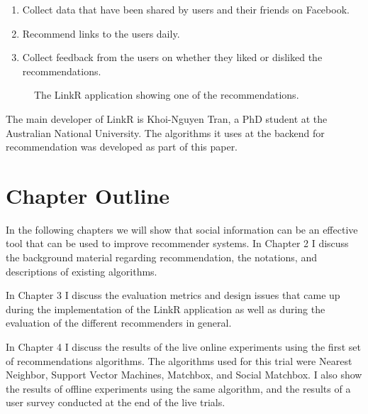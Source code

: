 \begin{enumerate}
\item{Collect data that have been shared by users and their friends on Facebook.}
\item{Recommend links to the users daily.}
\item{Collect feedback from the users on whether they liked or disliked the recommendations.}
\end{enumerate}

\begin{figure}[h]
\centering
{}
\caption{The LinkR application showing one of the recommendations.}
\end{figure}

The main developer of LinkR is Khoi-Nguyen Tran, a PhD student at the Australian National University. The algorithms it uses at the backend for recommendation was developed as part of this paper. 


\section{Chapter Outline}

In the following chapters we will show that social information can be an effective tool that can be used to improve recommender systems. In Chapter 2 I  discuss the background material regarding recommendation, the notations, and descriptions of existing algorithms. 

In Chapter 3 I discuss the evaluation metrics and design issues that came up during the implementation of the LinkR application as well as during the evaluation of the different recommenders in general.

In Chapter 4  I discuss the results of the live online experiments using the first set of recommendations algorithms. The algorithms used for this trial were Nearest Neighbor, Support Vector Machines, Matchbox, and Social Matchbox. I also show the results of offline experiments using the same algorithm, and the results of a user survey conducted at the end of the live trials.

